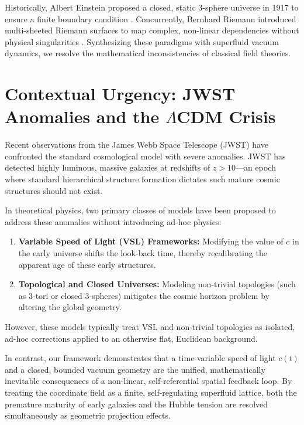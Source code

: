 \documentclass[11pt,a4paper]{article}
\theoremstyle{plain}
\theoremstyle{definition}
\theoremstyle{remark}
\begin{document}
Historically, Albert Einstein proposed a closed, static 3-sphere universe in 1917 to ensure a finite boundary condition \cite{einstein1917}. Concurrently, Bernhard Riemann introduced multi-sheeted Riemann surfaces to map complex, non-linear dependencies without physical singularities \cite{riemann1857}. Synthesizing these paradigms with superfluid vacuum dynamics, we resolve the mathematical inconsistencies of classical field theories.

\section{Contextual Urgency: JWST Anomalies and the $\Lambda$CDM Crisis}
Recent observations from the James Webb Space Telescope (JWST) have confronted the standard cosmological model with severe anomalies. JWST has detected highly luminous, massive galaxies at redshifts of $z > 10$—an epoch where standard hierarchical structure formation dictates such mature cosmic structures should not exist.

In theoretical physics, two primary classes of models have been proposed to address these anomalies without introducing ad-hoc physics:
\begin{enumerate}
    \item \textbf{Variable Speed of Light (VSL) Frameworks:} Modifying the value of $c$ in the early universe shifts the look-back time, thereby recalibrating the apparent age of these early structures.
    \item \textbf{Topological and Closed Universes:} Modeling non-trivial topologies (such as 3-tori or closed 3-spheres) mitigates the cosmic horizon problem by altering the global geometry.
\end{enumerate}
However, these models typically treat VSL and non-trivial topologies as isolated, ad-hoc corrections applied to an otherwise flat, Euclidean background. 

In contrast, our framework demonstrates that a time-variable speed of light $c(t)$ and a closed, bounded vacuum geometry are the unified, mathematically inevitable consequences of a non-linear, self-referential spatial feedback loop. By treating the coordinate field as a finite, self-regulating superfluid lattice, both the premature maturity of early galaxies and the Hubble tension are resolved simultaneously as geometric projection effects.

\newpage
\end{document}

